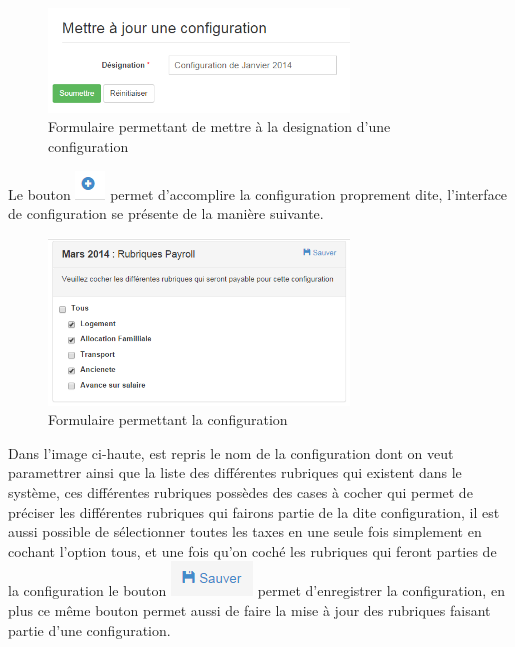 \documentclass[12pt,a4paper]{report}
\begin{document}
\begin{figure}[h]
\begin{center}
\includegraphics[width=8cm]{pic/UpDConfgRub.png}
\end{center}
\caption{Formulaire permettant de mettre à la designation d'une configuration}
\label{Formulaire permettant de mettre à la designation d'une configuration}
\end{figure} 

Le bouton  \includegraphics[scale=0.7]{pic/PlusConfigBlue.png} permet d'accomplire la configuration proprement dite, l'interface de configuration se présente de la manière suivante.  
\begin{figure}[h]
\begin{center}
\includegraphics[width=8cm]{pic/ConfigRubMenu.png}
\end{center}
\caption{Formulaire permettant la configuration}
\label{Formulaire permettant la configuration}
\end{figure} 

Dans l'image ci-haute, est repris le nom de la configuration dont on veut paramettrer ainsi que la liste des différentes rubriques qui existent dans le système, ces différentes rubriques possèdes des cases à cocher qui permet de préciser les différentes rubriques qui fairons partie de la dite configuration, il est aussi possible de sélectionner toutes les taxes en une seule fois simplement en cochant l'option tous, et une fois qu'on coché les rubriques qui feront parties de la configuration le bouton \includegraphics[scale=0.7]{pic/SaveConfig.png} permet d'enregistrer la configuration, en plus ce même bouton permet aussi de faire la mise à jour des rubriques faisant partie d'une configuration.
\end{document}

